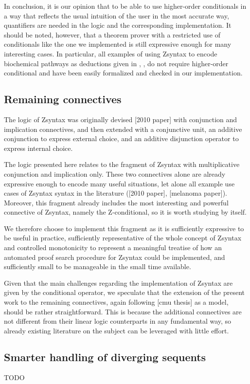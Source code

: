 In conclusion, it is our opinion that to be able to use higher-order
conditionals in a way that reflects the usual
intuition of the user in the most accurate way, quantifiers are needed in the
logic and the corresponding implementation.
It should be noted, however, that a theorem prover with a restricted use of
conditionals like the one we implemented is still expressive enough for many
interesting cases. In particular, all examples of using Zsyntax to encode
biochemical pathways as deductions given in \cite{2010paper},
\cite{adding-logic}, \cite{melanoma} do not require higher-order conditional and
have been easily formalized and checked in our implementation.

\subsection{Remaining connectives}

The logic of Zsyntax was originally devised [2010 paper] with conjunction and
implication connectives, and then extended \cite{adding-logic} with a
conjunctive unit, an additive conjunction to express external choice, and an
additive disjunction operator to express internal choice.

The logic presented here relates to the fragment of Zsyntax with multiplicative
conjunction and implication only. These two connectives alone are already
expressive enough to encode many useful situations, let alone all example use
cases of Zsyntax syntax in the literature ([2010 paper], [melanoma
paper]). Moreover, this fragment already includes the most interesting and
powerful connective of Zsyntax, namely the Z-conditional, so it is worth
studying by itself.

We therefore choose to implement this fragment as it is sufficiently expressive
to be useful in practice, sufficiently representative of the whole concept of
Zsyntax and controlled monotonicity to represent a meaningful treatise of how an
automated proof search procedure for Zsyntax could be implemented, and
sufficiently small to be manageable in the small time available.

Given that the main challenges regarding the implementation of Zsyntax are given
by the conditional operator, we speculate that the extension of the present work
to the remaining connectives, again following [cmu thesis] as a model, should be
rather straightforward. This is because the additional connectives are not
different from their linear logic counterparts in any fundamental way, so
already existing literature on the subject can be leveraged with little effort.

\subsection{Smarter handling of diverging sequents}

TODO

